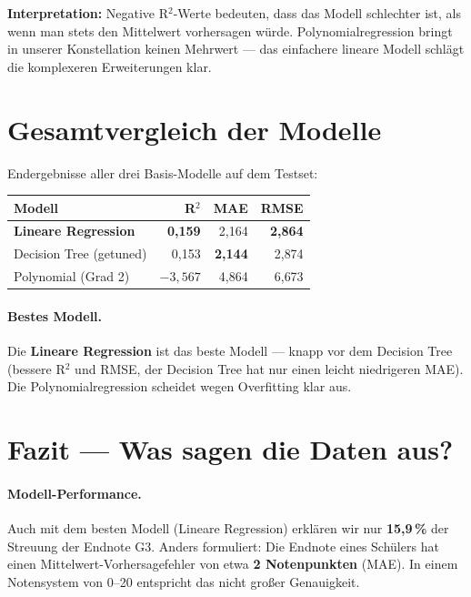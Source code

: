 \documentclass[11pt,a4paper]{article}
\begin{document}
\textbf{Interpretation:} Negative R$^{2}$-Werte bedeuten, dass das Modell schlechter ist, als wenn man stets den Mittelwert vorhersagen würde. Polynomialregression bringt in unserer Konstellation keinen Mehrwert --- das einfachere lineare Modell schlägt die komplexeren Erweiterungen klar.

\section{Gesamtvergleich der Modelle}

Endergebnisse aller drei Basis-Modelle auf dem Testset:

\begin{center}
\begin{tabular}{lrrr}
\toprule
\textbf{Modell} & \textbf{R$^{2}$} & \textbf{MAE} & \textbf{RMSE} \\
\midrule
\textbf{Lineare Regression} & \textbf{0{,}159} & 2{,}164 & \textbf{2{,}864} \\
Decision Tree (getuned) & 0{,}153 & \textbf{2{,}144} & 2{,}874 \\
Polynomial (Grad 2) & $-3{,}567$ & 4{,}864 & 6{,}673 \\
\bottomrule
\end{tabular}
\end{center}

\paragraph{Bestes Modell.} Die \textbf{Lineare Regression} ist das beste Modell --- knapp vor dem Decision Tree (bessere R$^{2}$ und RMSE, der Decision Tree hat nur einen leicht niedrigeren MAE). Die Polynomialregression scheidet wegen Overfitting klar aus.

\section{Fazit --- Was sagen die Daten aus?}

\paragraph{Modell-Performance.} Auch mit dem besten Modell (Lineare Regression) erklären wir nur \textbf{15{,}9\,\%} der Streuung der Endnote G3. Anders formuliert: Die Endnote eines Schülers hat einen Mittelwert-Vorhersagefehler von etwa \textbf{2 Notenpunkten} (MAE). In einem Notensystem von 0--20 entspricht das nicht großer Genauigkeit.
\end{document}
